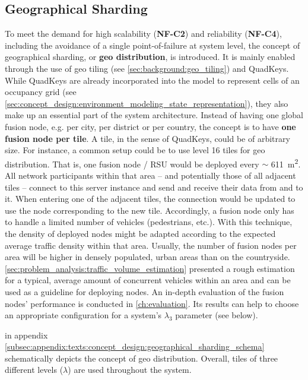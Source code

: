 \subsection{Geographical Sharding}
\label{subsec:concept_design:geographical_sharding}
To meet the demand for high scalability (\textbf{NF-C2}) and reliability (\textbf{NF-C4}), including the avoidance of a single point-of-failure at system level, the concept of geographical sharding, or \textbf{geo distribution}, is introduced. It is mainly enabled through the use of geo tiling (see \cref{sec:background:geo_tiling}) and QuadKeys. While QuadKeys are already incorporated into the model to represent cells of an occupancy grid (see \cref{sec:concept_design:environment_modeling_state_representation}), they also make up an essential part of the system architecture. Instead of having one global fusion node, e.g. per city, per district or per country, the concept is to have \textbf{one fusion node per tile}. A tile, in the sense of QuadKeys, could be of arbitrary size. For instance, a common setup could be to use level 16 tiles for geo distribution. That is, one fusion node / RSU would be deployed every $\sim$ \SI{611}{\square\meter}. All network participants within that area – and potentially those of all adjacent tiles – connect to this server instance and send and receive their data from and to it. When entering one of the adjacent tiles, the connection would be updated to use the node corresponding to the new tile. Accordingly, a fusion node only has to handle a limited number of vehicles (pedestrians, etc.). With this technique, the density of deployed nodes might be adapted according to the expected average traffic density within that area. Usually, the number of fusion nodes per area will be higher in densely populated, urban areas than on the countryside. \cref{sec:problem_analysis:traffic_volume_estimation} presented a rough estimation for a typical, average amount of concurrent vehicles within an area and can be used as a guideline for deploying nodes. An in-depth evaluation of the fusion nodes' performance is conducted in \cref{ch:evaluation}. Its results can help to choose an appropriate configuration for a system's $\lambda_3$ parameter (see below).
\par
\bigskip

 in appendix \cref{subsec:appendix:texts:concept_design:geographical_sharding_schema} schematically depicts the concept of geo distribution. Overall, tiles of three different levels ($\lambda$) are used throughout the system.

